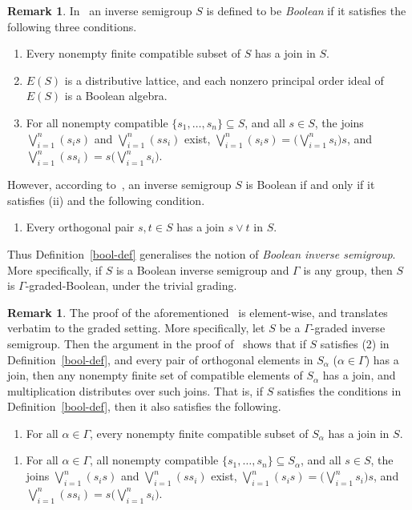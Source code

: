 \documentclass[a4paper,reqno,12pt]{amsart}
\numberwithin{equation}{section}
\theoremstyle{plain}
\theoremstyle{definition}
\newtheorem{remark}[thm]{Remark}
\begin{document}
\begin{remark}\label{bool-rem1}
In~\cite{Lawson3,Lawson1} an inverse semigroup $S$ is defined to be \emph{Boolean} if it satisfies the following three conditions.
\begin{enumerate}[\upshape(i)]
\item Every nonempty finite compatible subset of $S$ has a join in $S$.

\smallskip 

\item $E(S)$ is a distributive lattice, and each nonzero principal order ideal of $E(S)$ is a Boolean algebra.

\smallskip 

\item For all nonempty compatible $\{s_1, \dots, s_n\} \subseteq S$, and all $s \in S$, the joins $\bigvee_{i=1}^n(s_is)$ and $\bigvee_{i=1}^n(ss_i)$ exist, $\bigvee_{i=1}^n(s_is) = \big(\bigvee_{i=1}^ns_i\big)s$, and $\bigvee_{i=1}^n(ss_i) = s\big(\bigvee_{i=1}^ns_i\big)$.
\end{enumerate}
However, according to~\cite[Proposition 8.2.4]{Lawson1}, an inverse semigroup $S$ is Boolean if and only if it satisfies (ii) and the following condition.
\begin{enumerate}[\upshape(i$'$)]
\item Every orthogonal pair $s,t \in S$ has a join $s\vee t$ in $S$.
\end{enumerate}
Thus Definition~\ref{bool-def} generalises the notion of \emph{Boolean inverse semigroup}. More specifically, if $S$ is a Boolean inverse semigroup and $\Gamma$ is any group, then $S$ is $\Gamma$-graded-Boolean, under the trivial grading.
\end{remark}

\begin{remark}\label{bool-rem2}
The proof of the aforementioned~\cite[Proposition 8.2.4]{Lawson1} is element-wise, and translates verbatim to the graded setting. More specifically, let $S$ be a $\Gamma$-graded inverse semigroup. Then the argument in the proof of~\cite[Proposition 8.2.4]{Lawson1} shows that if $S$ satisfies (2) in Definition~\ref{bool-def}, and every pair of orthogonal elements in $S_{\alpha}$ ($\alpha \in \Gamma$) has a join, then any nonempty finite set of compatible elements of $S_{\alpha}$ has a join, and multiplication distributes over such joins. That is, if $S$ satisfies the conditions in Definition~\ref{bool-def}, then it also satisfies the following.
\begin{enumerate}[\upshape($1'$)]
\item For all $\alpha \in \Gamma$, every nonempty finite compatible subset of $S_{\alpha}$ has a join in $S$.
\end{enumerate}
\begin{enumerate}[\upshape($3'$)]
\item For all $\alpha \in \Gamma$, all nonempty compatible $\{s_1, \dots, s_n\} \subseteq S_{\alpha}$, and all $s \in S$, the joins $\bigvee_{i=1}^n(s_is)$ and $\bigvee_{i=1}^n(ss_i)$ exist, $\bigvee_{i=1}^n(s_is) = \big(\bigvee_{i=1}^ns_i\big)s$, and $\bigvee_{i=1}^n(ss_i) = s\big(\bigvee_{i=1}^ns_i\big)$.
\end{enumerate}
\end{remark}
\end{document}
